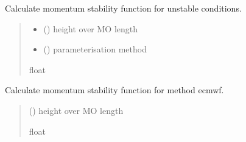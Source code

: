 \documentclass[letterpaper,10pt,english]{sphinxmanual}
\begin{document}
\begin{fulllineitems}
\label{\detokenize{users_guide:AirSeaFluxCode.flux_subs.stratification.psim_conv}}
\pysigstartsignatures
\pysiglinewithargsret
{}
{\sphinxparamcomma {}}
{}
\pysigstopsignatures
\sphinxAtStartPar
Calculate momentum stability function for unstable conditions.
\begin{quote}\begin{description}
\begin{itemize}
\item {}
\sphinxAtStartPar
{} () \textendash{} height over MO length

\item {}
\sphinxAtStartPar
{} () \textendash{} parameterisation method

\end{itemize}

\sphinxAtStartPar
{}

\sphinxAtStartPar
float

\end{description}\end{quote}

\end{fulllineitems}


\begin{fulllineitems}
\label{\detokenize{users_guide:AirSeaFluxCode.flux_subs.stratification.psim_ecmwf}}
\pysigstartsignatures
\pysiglinewithargsret
{}
{}
{}
\pysigstopsignatures
\sphinxAtStartPar
Calculate momentum stability function for method ecmwf.
\begin{quote}\begin{description}
\sphinxAtStartPar
{} () \textendash{} height over MO length

\sphinxAtStartPar
{}

\sphinxAtStartPar
float

\end{description}\end{quote}

\end{fulllineitems}
\end{document}
